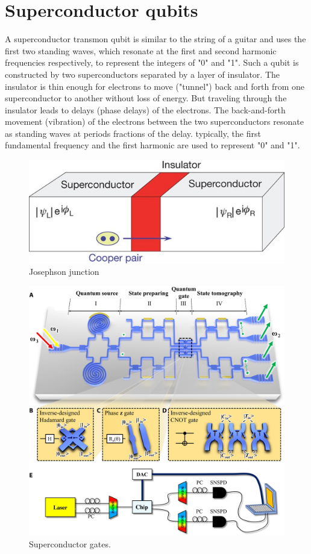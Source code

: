 \documentclass[oneside, letter, 12pt]{book}
\begin{document}
\section{Superconductor qubits}
A superconductor transmon qubit is similar to the string of a guitar and uses the first two standing waves, which resonate at the first and second harmonic frequencies respectively, to represent the integers of "0" and "1". Such a qubit is constructed by two superconductors separated by a layer of insulator. The insulator is thin enough for electrons to move ("tunnel") back and forth from one superconductor to another without loss of energy. But traveling through the insulator leads to delays (phase delays) of the electrons. The back-and-forth movement (vibration) of the electrons between the two superconductors resonate as standing waves at periods fractions of the delay. typically, the first fundamental frequency and the first harmonic are used to represent "0" and "1".
\begin{figure}[h]
\includegraphics[width=12cm]{pic/supercQubit.jpg}
\caption{Josephson junction}
\label{Superconductor}
\end{figure}

\begin{figure}[h]
\includegraphics[width=12cm]{pic/superGates.jpg}
\caption{Superconductor gates.}
\label{superGates}
\end{figure}
\end{document}
